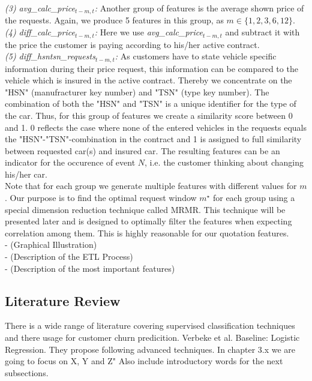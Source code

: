 \documentclass[12pt,titlepage]{article}
\begin{document}
\textit{(3) avg\_calc\_price$_{t - m, t}$:} Another group of features is the average shown price of the requests. Again, we produce 5 features in this group, as $m \in \{ 1, 2, 3, 6, 12\}$. \\
\textit{(4) diff\_calc\_price$_{t - m, t}$:} Here we use \textit{avg\_calc\_price$_{t - m, t}$} and subtract it with the price the customer is paying according to his/her active contract. \\
\textit{(5) diff\_hsntsn\_requests$_{t - m, t}$:} As customers have to state vehicle specific information during their price request, this information can be compared to the vehicle which is insured in the active contract. Thereby we concentrate on the "HSN" (manufracturer key number) and "TSN" (type key number). The combination of both the "HSN" and "TSN" is a unique identifier for the type of the car. Thus, for this group of features we create a similarity score between 0 and 1. 0 reflects the case where none of the entered vehicles in the requests equals the "HSN"-"TSN"-combination in the contract and 1 is assigned to full similarity between requested car(s) and insured car. The resulting features can be an indicator for the occurence of event $N$, i.e. the customer thinking about changing his/her car. \\
Note that for each group we generate multiple features with different values for $m$. Our purpose is to find the optimal request window $m^{\star}$ for each group using a special dimension reduction technique called MRMR. This technique will be presented later and is designed to optimally filter the features when expecting correlation among them. This is highly reasonable for our quotation features.\\

- (Graphical Illustration) \\
- (Description of the ETL Process) \\
- (Description of the most important features) \\


\subsection{Literature Review} \par

There is a wide range of literature covering supervised classification techniques and there usage for customer churn predicition. Verbeke et al. 
Baseline: Logistic Regression. They propose following advanced techniques. In chapter 3.x we are going to focus on X, Y and Z" Also include introductory words for the next subsections. \\
\end{document}
